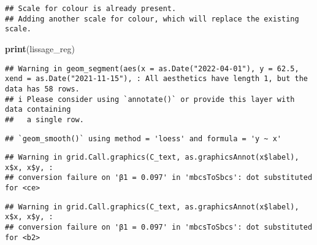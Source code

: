 \documentclass[
]{article}
\newenvironment{Shaded}{\begin{snugshade}}{\end{snugshade}}
\newcommand{\AttributeTok}[1]{\textcolor[rgb]{0.13,0.29,0.53}{#1}}
\newcommand{\DecValTok}[1]{\textcolor[rgb]{0.00,0.00,0.81}{#1}}
\newcommand{\FloatTok}[1]{\textcolor[rgb]{0.00,0.00,0.81}{#1}}
\newcommand{\FunctionTok}[1]{\textcolor[rgb]{0.13,0.29,0.53}{\textbf{#1}}}
\newcommand{\NormalTok}[1]{#1}
\newcommand{\SpecialCharTok}[1]{\textcolor[rgb]{0.81,0.36,0.00}{\textbf{#1}}}
\newcommand{\StringTok}[1]{\textcolor[rgb]{0.31,0.60,0.02}{#1}}
\begin{document}
\begin{Shaded}
\end{Shaded}

\begin{verbatim}
## Scale for colour is already present.
## Adding another scale for colour, which will replace the existing scale.
\end{verbatim}

\begin{Shaded}
\begin{Highlighting}[]
\FunctionTok{print}\NormalTok{(lissage\_reg)}
\end{Highlighting}
\end{Shaded}

\begin{verbatim}
## Warning in geom_segment(aes(x = as.Date("2022-04-01"), y = 62.5, xend = as.Date("2021-11-15"), : All aesthetics have length 1, but the data has 58 rows.
## i Please consider using `annotate()` or provide this layer with data containing
##   a single row.
\end{verbatim}

\begin{verbatim}
## `geom_smooth()` using method = 'loess' and formula = 'y ~ x'
\end{verbatim}

\begin{verbatim}
## Warning in grid.Call.graphics(C_text, as.graphicsAnnot(x$label), x$x, x$y, :
## conversion failure on 'β1 = 0.097' in 'mbcsToSbcs': dot substituted for <ce>
\end{verbatim}

\begin{verbatim}
## Warning in grid.Call.graphics(C_text, as.graphicsAnnot(x$label), x$x, x$y, :
## conversion failure on 'β1 = 0.097' in 'mbcsToSbcs': dot substituted for <b2>
\end{verbatim}
\end{document}
